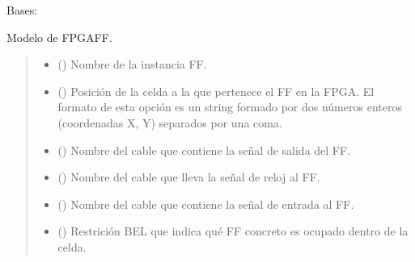 \documentclass[letterpaper,10pt,english]{sphinxmanual}
\begin{document}
\begin{fulllineitems}
\label{\detokenize{fpga:fpga.FlipFlop}}
\pysigstartsignatures
{}
\pysigstopsignatures
\sphinxAtStartPar
Bases: 

\sphinxAtStartPar
Modelo de FPGA\sphinxhyphen{}FF.
\begin{quote}\begin{description}
\begin{itemize}
\item {} 
\sphinxAtStartPar
{} () \textendash{} Nombre de la instancia FF.

\item {} 
\sphinxAtStartPar
{} () \textendash{} Posición de la celda a la que pertenece el FF en la FPGA. El formato de esta opción es un string formado por dos números enteros (coordenadas X, Y) separados por una coma.

\item {} 
\sphinxAtStartPar
{} () \textendash{} Nombre del cable que contiene la señal de salida del FF.

\item {} 
\sphinxAtStartPar
{} () \textendash{} Nombre del cable que lleva la señal de reloj al FF.

\item {} 
\sphinxAtStartPar
{} () \textendash{} Nombre del cable que contiene la señal de entrada al FF.

\item {} 
\sphinxAtStartPar
{} (\sphinxstyleliteralemphasis{\sphinxupquote{, }}\sphinxstyleliteralemphasis{\sphinxupquote{, }}\sphinxstyleliteralemphasis{\sphinxupquote{, }}) \textendash{} Restrición BEL que indica qué FF concreto es ocupado dentro de la celda.


\end{itemize}
\end{description}
\end{quote}
\end{fulllineitems}
\end{document}
